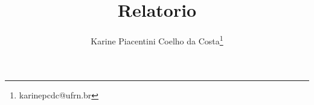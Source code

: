 \documentclass[12pt,openright]{report}
\title{\bf {Relatorio}}
\author{Karine Piacentini Coelho da Costa\footnote{karinepcdc@ufrn.br}}%
\begin{document}
%
\maketitle


\newpage
{}
\tableofcontents

\newpage
%

\newpage





%



%


% 

\renewcommand{\baselinestretch}{1}
\normalsize

%
%
%
%
%
%
%
%
%
%
%
%
%

\renewcommand{\baselinestretch}{1.5}
\normalsize
\end{document}
